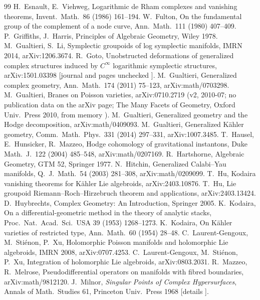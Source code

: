 \begin{thebibliography}{99}
 H.\ Esnault, E.\ Viehweg, Logarithmic de Rham complexes and vanishing theorems, Invent.\ Math.\ 86 (1986) 161--194.
 W.\ Fulton, On the fundamental group of the complement of a node curve, Ann.\ Math.\ 111 (1980) 407--409.
 P.\ Griffiths, J.\ Harris, Principles of Algebraic Geometry, Wiley 1978.
 M.\ Gualtieri, S.\ Li, Symplectic groupoids of log symplectic manifolds, IMRN 2014, arXiv:1206.3674.
 R.\ Goto, Unobstructed deformations of generalized complex structures induced by $C^\infty$ logarithmic symplectic structures, arXiv:1501.03398 [journal and pages unchecked \tQ].
 M.\ Gualtieri, Generalized complex geometry, Ann.\ Math.\ 174 (2011) 75--123, arXiv:math/0703298.
 M.\ Gualtieri, Branes on Poisson varieties, arXiv:0710.2719 (v2, 2010-07; no publication data on the arXiv page; The Many Facets of Geometry, Oxford Univ.\ Press 2010, from memory \tQ).
 M.\ Gualtieri, Generalized geometry and the Hodge decomposition, arXiv:math/0409093.
 M.\ Gualtieri, Generalized K\"ahler geometry, Comm.\ Math.\ Phys.\ 331 (2014) 297--331, arXiv:1007.3485.
 T.\ Hausel, E.\ Hunsicker, R.\ Mazzeo, Hodge cohomology of gravitational instantons, Duke Math.\ J.\ 122 (2004) 485--548, arXiv:math/0207169.
 R.\ Hartshorne, Algebraic Geometry, GTM 52, Springer 1977.
 N.\ Hitchin, Generalized Calabi--Yau manifolds, Q.\ J.\ Math.\ 54 (2003) 281--308, arXiv:math/0209099.
 T.\ Hu, Kodaira vanishing theorems for K\"ahler Lie algebroids, arXiv:2403.10876.
 T.\ Hu, Lie groupoid Riemann--Roch--Hirzebruch theorem and applications, arXiv:2403.13424.
 D.\ Huybrechts, Complex Geometry: An Introduction, Springer 2005.
 K.\ Kodaira, On a differential-geometric method in the theory of analytic stacks, Proc.\ Nat.\ Acad.\ Sci.\ USA 39 (1953) 1268--1273.
 K.\ Kodaira, On K\"ahler varieties of restricted type, Ann.\ Math.\ 60 (1954) 28--48.
 C.\ Laurent-Gengoux, M.\ Sti\'enon, P.\ Xu, Holomorphic Poisson manifolds and holomorphic Lie algebroids, IMRN 2008, arXiv:0707.4253.
 C.\ Laurent-Gengoux, M.\ Sti\'enon, P.\ Xu, Integration of holomorphic Lie algebroids, arXiv:0803.2031.
 R.\ Mazzeo, R.\ Melrose, Pseudodifferential operators on manifolds with fibred boundaries, arXiv:math/9812120.
 J.\ Milnor, \emph{Singular Points of Complex Hypersurfaces}, Annals of Math.\ Studies 61, Princeton Univ.\ Press 1968 [details \tQ].

\end{thebibliography}

